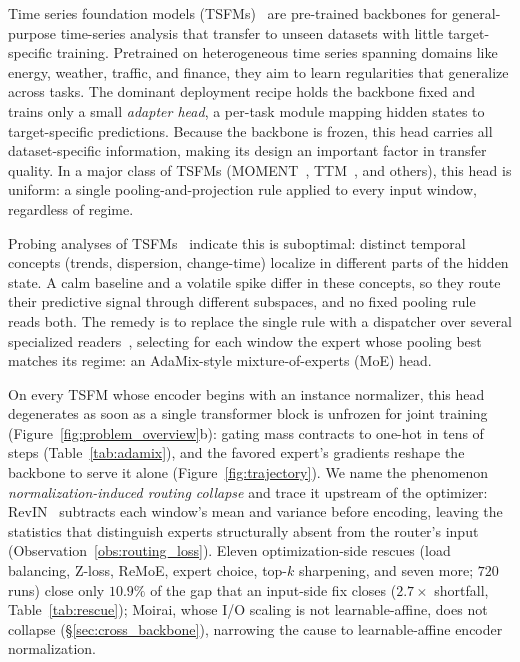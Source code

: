 \documentclass{article}
\begin{document}
Time series foundation models (TSFMs)~\citep{goswami2024moment, das2024timesfm, ansari2024chronos, liu2025timerxl, liu2024timer, woo2024moirai, lee2024units, rasul2024lagllama, ekambaram2024ttm, cohen2025toto, liu2025sundial, jin2024timellm, zhou2023onefitsall, liu2024autotimes, pan2024s2ipllm, liu2024unitime, shi2024timemoe, liu2026timers1} are pre-trained backbones for general-purpose time-series analysis that transfer to unseen datasets with little target-specific training. Pretrained on heterogeneous time series spanning domains like energy, weather, traffic, and finance, they aim to learn regularities that generalize across tasks. The dominant deployment recipe holds the backbone fixed and trains only a small \emph{adapter head}, a per-task module mapping hidden states to target-specific predictions. Because the backbone is frozen, this head carries all dataset-specific information, making its design an important factor in transfer quality. In a major class of TSFMs (MOMENT~\citep{goswami2024moment}, TTM~\citep{ekambaram2024ttm}, and others), this head is uniform: a single pooling-and-projection rule applied to every input window, regardless of regime.

Probing analyses of TSFMs~\citep{wilinski2025tsfm_representations, pandey2025tsfm_semantics} indicate this is suboptimal: distinct temporal concepts (trends, dispersion, change-time) localize in different parts of the hidden state. A calm baseline and a volatile spike differ in these concepts, so they route their predictive signal through different subspaces, and no fixed pooling rule reads both. The remedy is to replace the single rule with a dispatcher over several specialized readers~\citep{wang2022adamix}, selecting for each window the expert whose pooling best matches its regime: an AdaMix-style mixture-of-experts (MoE) head.

On every TSFM whose encoder begins with an instance normalizer, this head degenerates as soon as a single transformer block is unfrozen for joint training (Figure~\ref{fig:problem_overview}b): gating mass contracts to one-hot in tens of steps (Table~\ref{tab:adamix}), and the favored expert's gradients reshape the backbone to serve it alone (Figure~\ref{fig:trajectory}). We name the phenomenon \emph{normalization-induced routing collapse} and trace it upstream of the optimizer: RevIN~\citep{kim2021revin} subtracts each window's mean and variance before encoding, leaving the statistics that distinguish experts structurally absent from the router's input (Observation~\ref{obs:routing_loss}). Eleven optimization-side rescues (load balancing, Z-loss, ReMoE, expert choice, top-$k$ sharpening, and seven more; $720$ runs) close only $10.9\%$ of the gap that an input-side fix closes ($2.7\times$ shortfall, Table~\ref{tab:rescue}); Moirai, whose I/O scaling is not learnable-affine, does not collapse (\S\ref{sec:cross_backbone}), narrowing the cause to learnable-affine encoder normalization.
\end{document}
